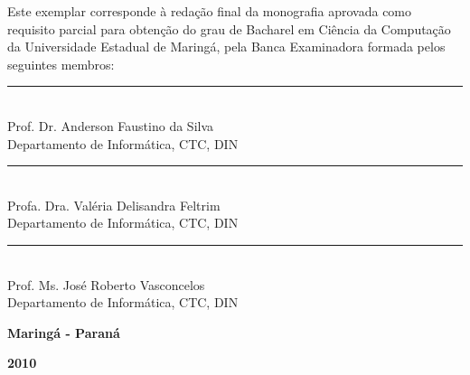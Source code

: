 \begin{center}
\textbf{\MakeUppercase{\docautor}}

\vspace{4cm}

\textbf{\MakeUppercase{\doctitulo}}

\vspace{2cm}

Este exemplar corresponde à redação final da monografia
aprovada como requisito parcial para obtenção do grau de
Bacharel em Ciência da Computação da Universidade Estadual de
Maringá, pela Banca Examinadora formada pelos
seguintes membros:

\end{center}

\vspace{2cm}

\begin{flushright}
\parbox{10cm}
{
\begin{center}

\rule{10cm}{.02cm} \\
Prof. Dr. Anderson Faustino da Silva \\
Departamento de Informática, CTC, DIN\\
\vspace{.40in}

\rule{10cm}{.02cm} \\
Profa. Dra. Valéria Delisandra Feltrim \\
Departamento de Informática, CTC, DIN\\
\vspace{.40in}

\rule{10cm}{.02cm} \\
Prof. Ms. José Roberto Vasconcelos \\
Departamento de Informática, CTC, DIN\\

\end{center}
}
\end{flushright}

\vspace{1cm}

\begin{center}
\centering
\textbf{Maringá - Paraná}

\textbf{2010}
\end{center}


\pagebreak

